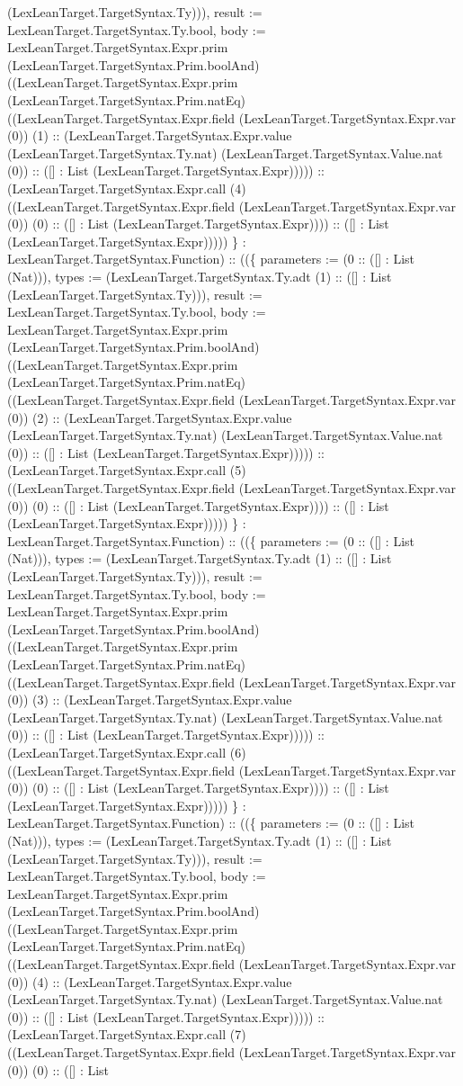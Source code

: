 \documentclass[11pt]{article}
\begin{document}
(LexLeanTarget.TargetSyntax.Ty))), result := LexLeanTarget.TargetSyntax.Ty.bool, body := LexLeanTarget.TargetSyntax.Expr.prim (LexLeanTarget.TargetSyntax.Prim.boolAnd) ((LexLeanTarget.TargetSyntax.Expr.prim (LexLeanTarget.TargetSyntax.Prim.natEq) ((LexLeanTarget.TargetSyntax.Expr.field (LexLeanTarget.TargetSyntax.Expr.var (0)) (1) :: (LexLeanTarget.TargetSyntax.Expr.value (LexLeanTarget.TargetSyntax.Ty.nat) (LexLeanTarget.TargetSyntax.Value.nat (0)) :: ([] : List (LexLeanTarget.TargetSyntax.Expr))))) :: (LexLeanTarget.TargetSyntax.Expr.call (4) ((LexLeanTarget.TargetSyntax.Expr.field (LexLeanTarget.TargetSyntax.Expr.var (0)) (0) :: ([] : List (LexLeanTarget.TargetSyntax.Expr)))) :: ([] : List (LexLeanTarget.TargetSyntax.Expr))))) \} : LexLeanTarget.TargetSyntax.Function) :: ((\{ parameters := (0 :: ([] : List (Nat))), types := (LexLeanTarget.TargetSyntax.Ty.adt (1) :: ([] : List (LexLeanTarget.TargetSyntax.Ty))), result := LexLeanTarget.TargetSyntax.Ty.bool, body := LexLeanTarget.TargetSyntax.Expr.prim (LexLeanTarget.TargetSyntax.Prim.boolAnd) ((LexLeanTarget.TargetSyntax.Expr.prim (LexLeanTarget.TargetSyntax.Prim.natEq) ((LexLeanTarget.TargetSyntax.Expr.field (LexLeanTarget.TargetSyntax.Expr.var (0)) (2) :: (LexLeanTarget.TargetSyntax.Expr.value (LexLeanTarget.TargetSyntax.Ty.nat) (LexLeanTarget.TargetSyntax.Value.nat (0)) :: ([] : List (LexLeanTarget.TargetSyntax.Expr))))) :: (LexLeanTarget.TargetSyntax.Expr.call (5) ((LexLeanTarget.TargetSyntax.Expr.field (LexLeanTarget.TargetSyntax.Expr.var (0)) (0) :: ([] : List (LexLeanTarget.TargetSyntax.Expr)))) :: ([] : List (LexLeanTarget.TargetSyntax.Expr))))) \} : LexLeanTarget.TargetSyntax.Function) :: ((\{ parameters := (0 :: ([] : List (Nat))), types := (LexLeanTarget.TargetSyntax.Ty.adt (1) :: ([] : List (LexLeanTarget.TargetSyntax.Ty))), result := LexLeanTarget.TargetSyntax.Ty.bool, body := LexLeanTarget.TargetSyntax.Expr.prim (LexLeanTarget.TargetSyntax.Prim.boolAnd) ((LexLeanTarget.TargetSyntax.Expr.prim (LexLeanTarget.TargetSyntax.Prim.natEq) ((LexLeanTarget.TargetSyntax.Expr.field (LexLeanTarget.TargetSyntax.Expr.var (0)) (3) :: (LexLeanTarget.TargetSyntax.Expr.value (LexLeanTarget.TargetSyntax.Ty.nat) (LexLeanTarget.TargetSyntax.Value.nat (0)) :: ([] : List (LexLeanTarget.TargetSyntax.Expr))))) :: (LexLeanTarget.TargetSyntax.Expr.call (6) ((LexLeanTarget.TargetSyntax.Expr.field (LexLeanTarget.TargetSyntax.Expr.var (0)) (0) :: ([] : List (LexLeanTarget.TargetSyntax.Expr)))) :: ([] : List (LexLeanTarget.TargetSyntax.Expr))))) \} : LexLeanTarget.TargetSyntax.Function) :: ((\{ parameters := (0 :: ([] : List (Nat))), types := (LexLeanTarget.TargetSyntax.Ty.adt (1) :: ([] : List (LexLeanTarget.TargetSyntax.Ty))), result := LexLeanTarget.TargetSyntax.Ty.bool, body := LexLeanTarget.TargetSyntax.Expr.prim (LexLeanTarget.TargetSyntax.Prim.boolAnd) ((LexLeanTarget.TargetSyntax.Expr.prim (LexLeanTarget.TargetSyntax.Prim.natEq) ((LexLeanTarget.TargetSyntax.Expr.field (LexLeanTarget.TargetSyntax.Expr.var (0)) (4) :: (LexLeanTarget.TargetSyntax.Expr.value (LexLeanTarget.TargetSyntax.Ty.nat) (LexLeanTarget.TargetSyntax.Value.nat (0)) :: ([] : List (LexLeanTarget.TargetSyntax.Expr))))) :: (LexLeanTarget.TargetSyntax.Expr.call (7) ((LexLeanTarget.TargetSyntax.Expr.field (LexLeanTarget.TargetSyntax.Expr.var (0)) (0) :: ([] : List 
\end{document}
